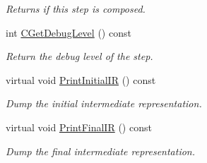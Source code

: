 \begin{DoxyCompactItemize}
\begin{DoxyCompactList}\small\item\em Returns if this step is composed. \end{DoxyCompactList}\item 
int \hyperlink{classDesignFlowStep_a3b33b8a51e6b58238a8377d077523b88}{C\+Get\+Debug\+Level} () const
\begin{DoxyCompactList}\small\item\em Return the debug level of the step. \end{DoxyCompactList}\item 
virtual void \hyperlink{classDesignFlowStep_a2a169bd0ac5fe3cd5179871714cbe1ab}{Print\+Initial\+IR} () const
\begin{DoxyCompactList}\small\item\em Dump the initial intermediate representation. \end{DoxyCompactList}\item 
virtual void \hyperlink{classDesignFlowStep_a1d30b6b575c459521803a388a2085d60}{Print\+Final\+IR} () const
\begin{DoxyCompactList}\small\item\em Dump the final intermediate representation. \end{DoxyCompactList}\end{DoxyCompactItemize}
